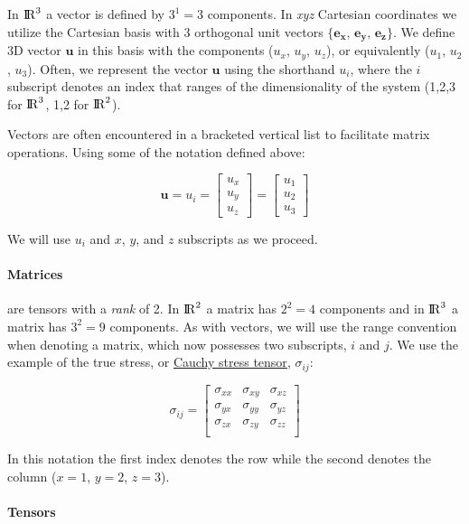 In ${\rm I\!R}^3$ a vector is defined by $3^{1} = 3$ components. In \textit{xyz} Cartesian coordinates we utilize the Cartesian basis with 3 orthogonal unit vectors $\{\mathbf{e}_{\mathbf{x}}\text{, } \mathbf{e}_{\mathbf{y}}\text{, } \mathbf{e}_{\mathbf{z}}\}$. We define 3D vector $\mathbf{u}$ in this basis with the components ($u_x$, $u_y$, $u_z$), or equivalently  ($u_1$, $u_2$, $u_3$). Often, we represent the vector $\mathbf{u}$ using the shorthand $u_i$, where the $i$ subscript denotes an index that ranges of the dimensionality of the system (1,2,3 for ${\rm I\!R}^3$, 1,2 for ${\rm I\!R}^2$). %

Vectors are often encountered in a bracketed vertical list to facilitate matrix operations. Using some of the notation defined above:

\begin{equation}
\mathbf{u} = u_i = 
	\begin{bmatrix}
    u_x \\
    u_y \\
    u_z
	\end{bmatrix} =
	\begin{bmatrix}
    u_1 \\
    u_2 \\
    u_3
	\end{bmatrix}
	\label{eq:Vector}
\end{equation}

We will use $u_i$ and $x$, $y$, and $z$ subscripts as we proceed.

\paragraph{Matrices} are tensors with a \emph{rank} of 2.  In ${\rm I\!R}^2$ a matrix has $2^{2} = 4$ components and in ${\rm I\!R}^3$ a matrix has $3^{2} = 9$ components. As with vectors, we will use the range convention when denoting a matrix, which now possesses two subscripts, $i$ and $j$. We use the example of the true stress, or \href{https://en.wikipedia.org/wiki/Cauchy_stress_tensor}{Cauchy stress tensor}, $\sigma_{ij}$:

\begin{equation}
\sigma_{ij} =  
	\begin{bmatrix}
    \sigma_{xx} & \sigma_{xy} & \sigma_{xz}\\
    \sigma_{yx} & \sigma_{yy} & \sigma_{yz}\\
    \sigma_{zx} & \sigma_{zy} & \sigma_{zz}\\
	\end{bmatrix}
\end{equation}

In this notation the first index denotes the row while the second denotes the column ($x = 1$, $y = 2$, $z = 3$).

\paragraph{Tensors}


